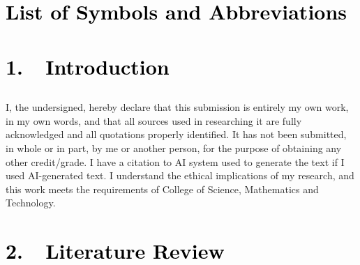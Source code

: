 \documentclass[a4paper,12pt]{article}
\begin{document}
\clearpage\section[List of Symbols and Abbreviations]{\textbf{\textcolor{black}{List of Symbols and Abbreviations }}\textbf{\textcolor{black}{ }}}

\clearpage\clearpage
\pagestyle{Convertedi}
\setcounter{page}{1}

\section[1.\ \ Introduction]{\textbf{\textcolor{black}{1.\ \ Introduction}}}

\subsection[1.1. \ \ AAAAAAAAAAAAAAAA]{\textbf{\textcolor{black}{}}}
\begin{flushleft} \justifying
I, the undersigned, hereby declare that this submission is entirely my own work, in my own words, and that all sources used in researching it are fully acknowledged and all quotations properly identified. It has not been submitted, in whole or in part, by me or another person, for the purpose of obtaining any other credit/grade. I have a citation to AI system used to generate the text if I used AI-generated text. I understand the ethical implications of my research, and this work meets the requirements of College of Science, Mathematics and Technology.\cite{nandhini2021deep}
\end{flushleft}


\bigskip

\subsection[1.2. \ \ BBBBBBBBBBBBBBBBBB]{\textbf{\textcolor{black}{}}}

\subsection[1.3. \ \ CCCCCCCCCCCCCCCCCC]{\textbf{\textcolor{black}{}}}

\clearpage\section[2.\ \ Literature Review]{\textbf{\textcolor{black}{2.\ \ Literature Review}}\textbf{\textcolor{black}{ }}}
\end{document}

